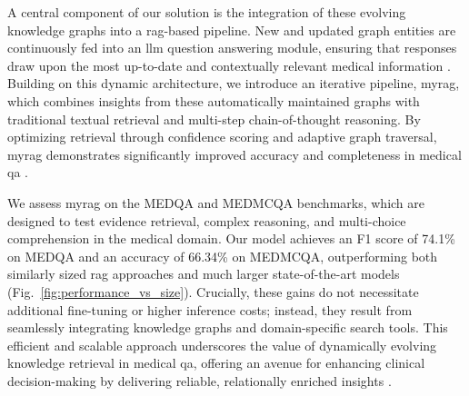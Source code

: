 A central component of our solution is the integration of these evolving knowledge graphs into a \gls{rag}-based pipeline. New and updated graph entities are continuously fed into an \gls{llm} question answering module, ensuring that responses draw upon the most up-to-date and contextually relevant medical information \cite{singhal2022large}. Building on this dynamic architecture, we introduce an iterative pipeline, \gls{myrag}, which combines insights from these automatically maintained graphs with traditional textual retrieval and multi-step chain-of-thought reasoning. By optimizing retrieval through confidence scoring and adaptive graph traversal, \gls{myrag} demonstrates significantly improved accuracy and completeness in medical \gls{qa} \cite{trivedi2022interleaving}.

We assess \gls{myrag} on the MEDQA and MEDMCQA benchmarks, which are designed to test evidence retrieval, complex reasoning, and multi-choice comprehension in the medical domain. Our model achieves an F1 score of 74.1\% on MEDQA and an accuracy of 66.34\% on MEDMCQA, outperforming both similarly sized \gls{rag} approaches and much larger state-of-the-art models (Fig.~\ref{fig:performance_vs_size}). Crucially, these gains do not necessitate additional fine-tuning or higher inference costs; instead, they result from seamlessly integrating knowledge graphs and domain-specific search tools. This efficient and scalable approach underscores the value of dynamically evolving knowledge retrieval in medical \gls{qa}, offering an avenue for enhancing clinical decision-making by delivering reliable, relationally enriched insights \cite{zhou2023survey}.